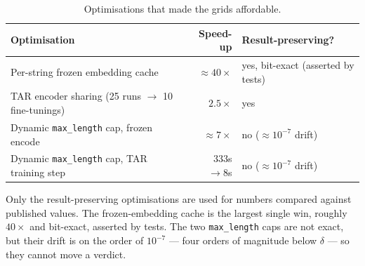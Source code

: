 \documentclass[10pt,letterpaper]{article}
\begin{document}
\begin{table}[H]
\centering\small
\caption{Optimisations that made the grids affordable.}
\begin{tabular}{lrl}
\toprule
Optimisation & Speed-up & Result-preserving? \\
\midrule
Per-string frozen embedding cache & $\approx 40\times$ & yes, bit-exact (asserted by tests) \\
TAR encoder sharing (25 runs $\rightarrow$ 10 fine-tunings) & $2.5\times$ & yes \\
Dynamic \texttt{max\_length} cap, frozen encode & $\approx 7\times$ & no ($\approx 10^{-7}$ drift) \\
Dynamic \texttt{max\_length} cap, TAR training step & $333$s $\rightarrow 8$s & no ($\approx 10^{-7}$ drift) \\
\bottomrule
\end{tabular}
\end{table}

\noindent Only the result-preserving optimisations are used for numbers compared against published
values. The frozen-embedding cache is the largest single win, roughly $40\times$ and bit-exact,
asserted by tests. The two \texttt{max\_length} caps are not exact, but their drift is on the
order of $10^{-7}$ --- four orders of magnitude below $\delta$ --- so they cannot move a
verdict.
\end{document}
